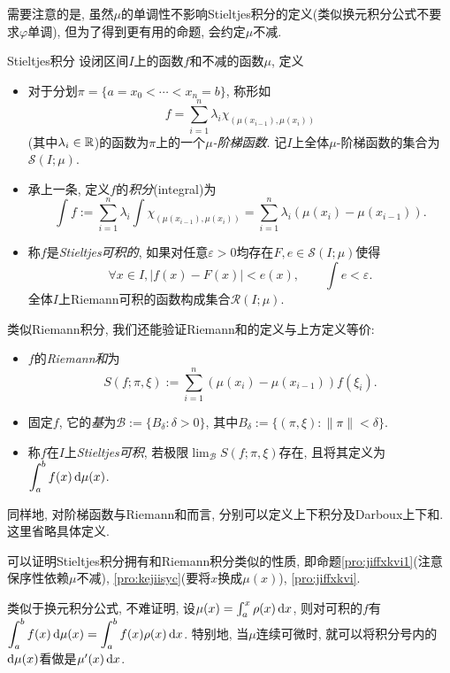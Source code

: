 需要注意的是, 虽然$\mu $的单调性不影响Stieltjes积分的定义(类似换元积分公式不要求$\varphi$单调), 但为了得到更有用的命题, 会约定$\mu$不减. 

\begin{definition}{Stieltjes积分}
	设闭区间$I$上的函数$f$和不减的函数$\mu$, 定义
	\begin{itemize}
		\item 对于分划$\pi = \{ a=x_0<\cdots <x_n=b \}$, 称形如$$f = \sum_{i=1}^{n} \lambda _i \chi _{(\mu (x_{i-1}),\mu (x_{i}))} $$
		(其中$\lambda _i \in \mathbb{R}$)的函数为$\pi$上的一个\textit{$\mu$-阶梯函数}. 记$I$上全体$\mu$-阶梯函数的集合为$\mathcal{S}(I;\mu )$. 
		\item 承上一条, 定义$f$的\textit{积分}(integral)为$$\int f := \sum_{i=1}^{n} \lambda _i \int \chi _{(\mu (x_{i-1}), \mu (x_i))} = \sum_{i=1}^{n} \lambda _i (\mu (x_i)-\mu (x_{i-1})). $$
		\item 称$f$是\textit{Stieltjes可积的}, 如果对任意$\varepsilon >0$均存在$F,e \in \mathcal{S}(I;\mu )$使得$$\forall x \in I,|f(x)-F(x)|<e(x),\qquad \int e < \varepsilon .$$
	全体$I$上Riemann可积的函数构成集合$\mathcal{R}(I;\mu)$. 
	\end{itemize}
	类似Riemann积分, 我们还能验证Riemann和的定义与上方定义等价: 
	\begin{itemize}
		\item $f$的\textit{Riemann和}为$$S(f;\pi ,\xi) := \sum_{i=1}^{n} (\mu(x_i)-\mu(x_{i-1}))f(\xi _i) .$$
		\item 固定$f$, 它的\textit{基}为$\mathcal{B} := \{ B_{\delta}:\delta >0 \}$, 其中$B_{\delta} := \{ (\pi ,\xi) : \| \pi \|< \delta \}$. 
		\item 称$f$在$I$上\textit{Stieltjes可积}, 若极限$\displaystyle \lim_{\mathcal{B}} S(f;\pi ,\xi)$存在, 且将其定义为$\displaystyle \int_a^b f(x) \mathop{}\!\mathrm{d} \mu (x)$. 
	\end{itemize}
\end{definition}

同样地, 对阶梯函数与Riemann和而言, 分别可以定义上下积分及Darboux上下和. 这里省略具体定义. 

可以证明Stieltjes积分拥有和Riemann积分类似的性质, 即命题\ref{pro:jiffxkvi1}(注意保序性依赖$\mu$不减), \ref{pro:kejiisyc}(要将$x$换成$\mu (x)$), \ref{pro:jiffxkvi}. 

类似于换元积分公式, 不难证明, 设$\mu (x) = \int_a^x \rho (x)\mathop{}\!\mathrm{d} x$, 则对可积的$f$有$\displaystyle \int_a^b f(x) \mathop{}\!\mathrm{d} \mu (x) = \int_a^b f(x) \rho (x) \mathop{}\!\mathrm{d} x$. 特别地, 当$\mu$连续可微时, 就可以将积分号内的$\mathop{}\!\mathrm{d} \mu (x)$看做是$\mu '(x) \mathop{}\!\mathrm{d} x$. 

